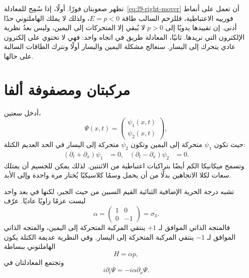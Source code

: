 تظهر صعوبتان فورًا. أولًا، إذا سُمِح للمعادلة~\eqref{eq:l9-right-mover} أن تعمل على أنماط فورييه الاعتباطية، فللزخم السالب طاقة \(E=p<0\)، ولذلك لا يملك الهاملتوني حدًا أدنى. إن تقييدها يدويًا إلى \(p>0\) لا يُبقي إلا المتحركات إلى اليمين، وليس بعدُ نظرية الإلكترون التي نريدها. ثانيًا، المعادلة طريق في اتجاه واحد: فهي لا تحتوي على إلكترون عادي يتحرك إلى اليسار. سنعالج مشكلة اليمين واليسار أولًا ونترك الطاقات السالبة على حالها.

\section{مركبتان ومصفوفة ألفا}

أدخل سعتين،
\begin{equation}
\Psi(x,t)=
\begin{pmatrix}
\psi_1(x,t)\\[3pt]
\psi_2(x,t)
\end{pmatrix},
\end{equation}
حيث تكون \(\psi_1\) متحركة إلى اليمين وتكون \(\psi_2\) متحركة إلى اليسار في الحد العديم الكتلة:
\begin{align}
(\partial_t+\partial_x)\psi_1&=0,
&
(\partial_t-\partial_x)\psi_2&=0.
\end{align}
وتسمح ميكانيكا الكم أيضًا بتراكبات اعتباطية من الاثنتين. لذلك يمكن للجسيم أن يمتلك سعات لكلا الاتجاهين بدلًا من أن يحمل وسمًا كلاسيكيًا يُختار مرة واحدة وإلى الأبد.

تشبه درجة الحرية الإضافية الثنائية القيم السبين من حيث الجبر، لكنها في بعد واحد ليست عزمًا زاويًا عاديًا. عرّف
\begin{equation}
\alpha=
\begin{pmatrix}
1&0\\
0&-1
\end{pmatrix}
=\sigma_3.
\label{eq:l9-alpha}
\end{equation}
فالمتجه الذاتي الموافق لـ \(+1\) ينتقي المركبة المتحركة إلى اليمين، والمتجه الذاتي الموافق لـ \(-1\) ينتقي المركبة المتحركة إلى اليسار. وفي النظرية عديمة الكتلة يكون الهاملتوني ببساطة
\begin{equation}
H=\alpha p,
\end{equation}
وتجتمع المعادلتان في
\begin{equation}
i\partial_t\Psi=-i\alpha\partial_x\Psi.
\label{eq:l9-massless-dirac}
\end{equation}

\begin{classroomqa}
\end{classroomqa}

